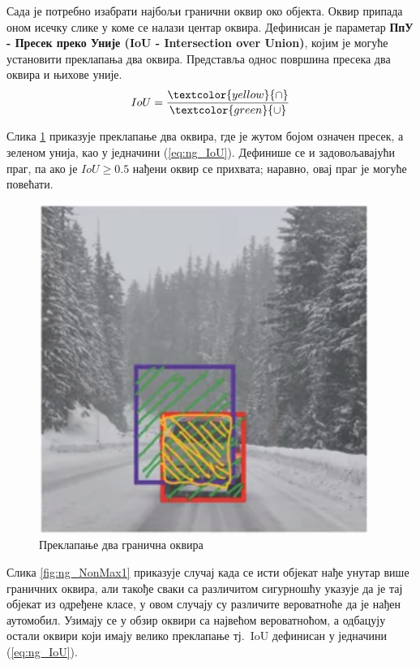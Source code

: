 \documentclass[12pt, а4paper]{article}
\begin{document}
Сада је потребно изабрати најбољи гранични оквир око објекта.
Оквир припада оном исечку слике у коме се налази центар оквира.
\newpage
Дефинисан је параметар
\textbf{ПпУ - Пресек преко Уније (IoU - Intersection over Union)},
којим је могуће установити преклапања два оквира.
Представља однос површина пресека два оквира и њихове уније.
\begin{equation}
IoU = \frac{\textcolor{yellow}{\cap}}{\textcolor{green}{\cup}}
\label{eq:ng_IoU}
\end{equation}

Слика \ref{fig:ng_IoU} приказује преклапање два оквира, где је
жутом бојом означен пресек, а зеленом унија, као
у једначини (\ref{eq:ng_IoU}).
Дефинише се и задовољавајући праг, па ако је $IoU \geq 0.5$ нађени
оквир се прихвата; наравно, овај праг је могуће повећати.
\begin{figure}[H]
  \centering
      \includegraphics[scale=0.6]{slike/ngIoU.png}
  \caption{Преклапање два гранична оквира}
  \label{fig:ng_IoU}
\end{figure}

Слика \ref{fig:ng_NonMax1} приказује случај када се исти објекат
нађе унутар више граничних оквира, али такође сваки са различитом
сигурношћу указује да је тај објекат из одређене класе, у овом
случају су различите вероватноће да је нађен аутомобил.
\newpage
Узимају се у обзир оквири са највећом вероватноћом, а одбацују остали
оквири који имају велико преклапање тј.\ IoU дефинисан у
једначини (\ref{eq:ng_IoU}).
\end{document}
